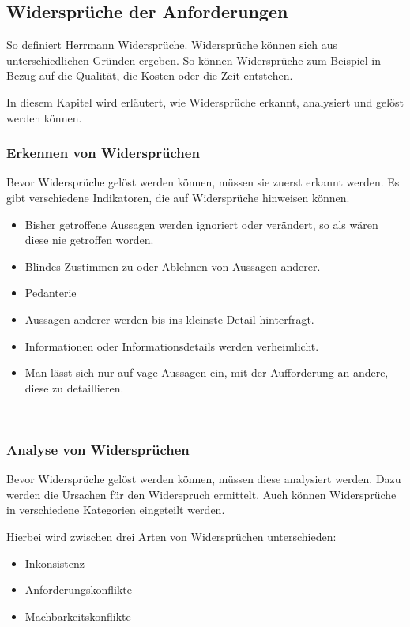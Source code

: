 \subsection{Widersprüche der Anforderungen}\label{subsec:widersprueche}
\autocite[][S.233]{Herrmann.2022}
So definiert Herrmann Widersprüche.
Widersprüche können sich aus unterschiedlichen Gründen ergeben.
So können Widersprüche zum Beispiel in Bezug auf die Qualität, die Kosten oder die Zeit entstehen.

In diesem Kapitel wird erläutert, wie Widersprüche erkannt, analysiert und gelöst werden können.

\subsubsection{Erkennen von Widersprüchen}\label{subsubsec:erkennung}
Bevor Widersprüche gelöst werden können, müssen sie zuerst erkannt werden.
Es gibt verschiedene Indikatoren, die auf Widersprüche hinweisen können.
\begin{itemize}
    \item Bisher getroffene Aussagen werden ignoriert oder verändert, so als wären diese nie getroffen worden.
    \item Blindes Zustimmen zu oder Ablehnen von Aussagen anderer.
    \item Pedanterie
    \item Aussagen anderer werden bis ins kleinste Detail hinterfragt.
    \item Informationen oder Informationsdetails werden verheimlicht.
    \item Man lässt sich nur auf vage Aussagen ein, mit der Aufforderung an andere, diese zu detaillieren.
\end{itemize}~\autocite[vgl.][S.43]{OliverCreighton.2012}

\subsubsection{Analyse von Widersprüchen}\label{subsubsec:analyse}
Bevor Widersprüche gelöst werden können, müssen diese analysiert werden.
Dazu werden die Ursachen für den Widerspruch ermittelt.
Auch können Widersprüche in verschiedene Kategorien eingeteilt werden.

Hierbei wird zwischen drei Arten von Widersprüchen unterschieden:
\begin{itemize}
    \item Inkonsistenz
    \item Anforderungskonflikte
    \item Machbarkeitskonflikte
\end{itemize}~\autocite[vgl.][S.235f]{OliverCreighton.2012}

